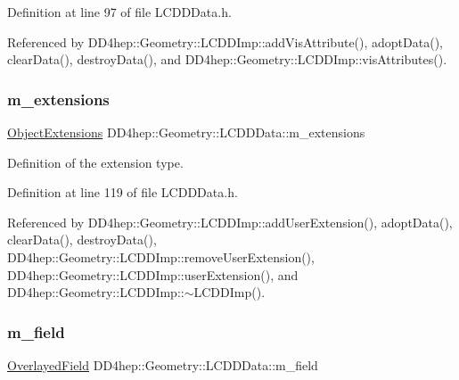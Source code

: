 Definition at line 97 of file L\+C\+D\+D\+Data.\+h.



Referenced by D\+D4hep\+::\+Geometry\+::\+L\+C\+D\+D\+Imp\+::add\+Vis\+Attribute(), adopt\+Data(), clear\+Data(), destroy\+Data(), and D\+D4hep\+::\+Geometry\+::\+L\+C\+D\+D\+Imp\+::vis\+Attributes().

\hypertarget{class_d_d4hep_1_1_geometry_1_1_l_c_d_d_data_a686aca104b9460a62e5a89d8abbd3b7c}{}\label{class_d_d4hep_1_1_geometry_1_1_l_c_d_d_data_a686aca104b9460a62e5a89d8abbd3b7c} 
\subsubsection{\texorpdfstring{m\+\_\+extensions}{m\_extensions}}
{\footnotesize\ttfamily \hyperlink{class_d_d4hep_1_1_object_extensions}{Object\+Extensions} D\+D4hep\+::\+Geometry\+::\+L\+C\+D\+D\+Data\+::m\+\_\+extensions\hspace{0.3cm}{\ttfamily [protected]}}



Definition of the extension type. 



Definition at line 119 of file L\+C\+D\+D\+Data.\+h.



Referenced by D\+D4hep\+::\+Geometry\+::\+L\+C\+D\+D\+Imp\+::add\+User\+Extension(), adopt\+Data(), clear\+Data(), destroy\+Data(), D\+D4hep\+::\+Geometry\+::\+L\+C\+D\+D\+Imp\+::remove\+User\+Extension(), D\+D4hep\+::\+Geometry\+::\+L\+C\+D\+D\+Imp\+::user\+Extension(), and D\+D4hep\+::\+Geometry\+::\+L\+C\+D\+D\+Imp\+::$\sim$\+L\+C\+D\+D\+Imp().

\hypertarget{class_d_d4hep_1_1_geometry_1_1_l_c_d_d_data_a42d36b262bf1bf83780264efcd227bcd}{}\label{class_d_d4hep_1_1_geometry_1_1_l_c_d_d_data_a42d36b262bf1bf83780264efcd227bcd} 
\subsubsection{\texorpdfstring{m\+\_\+field}{m\_field}}
{\footnotesize\ttfamily \hyperlink{class_d_d4hep_1_1_geometry_1_1_overlayed_field}{Overlayed\+Field} D\+D4hep\+::\+Geometry\+::\+L\+C\+D\+D\+Data\+::m\+\_\+field\hspace{0.3cm}{\ttfamily [protected]}}



